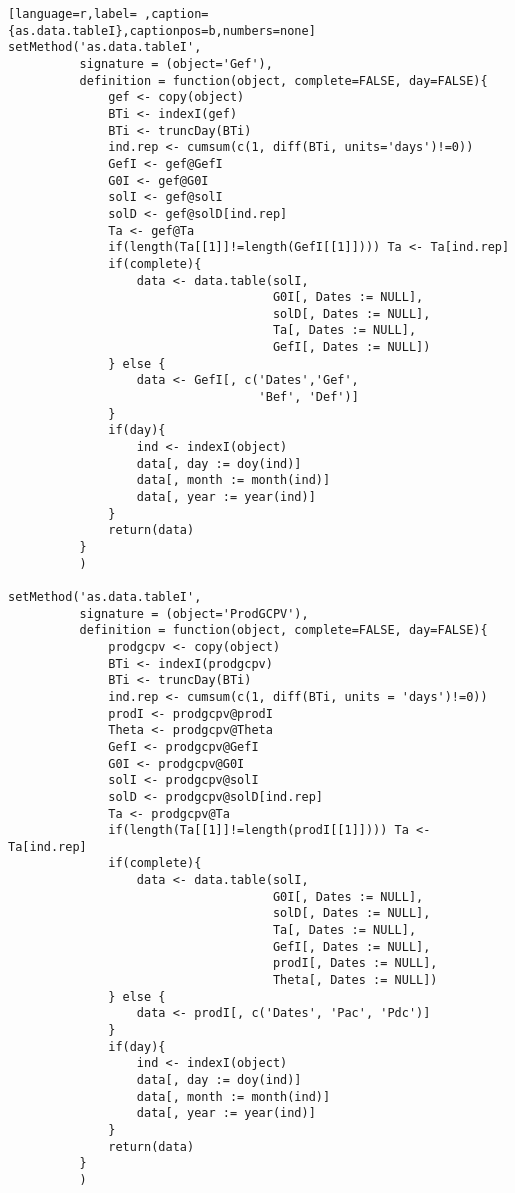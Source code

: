 \begin{lstlisting}[language=r,label= ,caption={as.data.tableI},captionpos=b,numbers=none]
setMethod('as.data.tableI',
          signature = (object='Gef'),
          definition = function(object, complete=FALSE, day=FALSE){
              gef <- copy(object)
              BTi <- indexI(gef)
              BTi <- truncDay(BTi)
              ind.rep <- cumsum(c(1, diff(BTi, units='days')!=0))
              GefI <- gef@GefI
              G0I <- gef@G0I
              solI <- gef@solI
              solD <- gef@solD[ind.rep]
              Ta <- gef@Ta
              if(length(Ta[[1]]!=length(GefI[[1]]))) Ta <- Ta[ind.rep]
              if(complete){
                  data <- data.table(solI,
                                     G0I[, Dates := NULL],
                                     solD[, Dates := NULL],
                                     Ta[, Dates := NULL],
                                     GefI[, Dates := NULL])
              } else {
                  data <- GefI[, c('Dates','Gef',
                                   'Bef', 'Def')]
              }
              if(day){
                  ind <- indexI(object)
                  data[, day := doy(ind)]
                  data[, month := month(ind)]
                  data[, year := year(ind)]
              }
              return(data)
          }
          )

setMethod('as.data.tableI',
          signature = (object='ProdGCPV'),
          definition = function(object, complete=FALSE, day=FALSE){
              prodgcpv <- copy(object)
              BTi <- indexI(prodgcpv)
              BTi <- truncDay(BTi)
              ind.rep <- cumsum(c(1, diff(BTi, units = 'days')!=0))
              prodI <- prodgcpv@prodI
              Theta <- prodgcpv@Theta
              GefI <- prodgcpv@GefI
              G0I <- prodgcpv@G0I
              solI <- prodgcpv@solI
              solD <- prodgcpv@solD[ind.rep]
              Ta <- prodgcpv@Ta
              if(length(Ta[[1]]!=length(prodI[[1]]))) Ta <- Ta[ind.rep]
              if(complete){
                  data <- data.table(solI,
                                     G0I[, Dates := NULL],
                                     solD[, Dates := NULL],
                                     Ta[, Dates := NULL],
                                     GefI[, Dates := NULL],
                                     prodI[, Dates := NULL],
                                     Theta[, Dates := NULL])
              } else {
                  data <- prodI[, c('Dates', 'Pac', 'Pdc')]
              }
              if(day){
                  ind <- indexI(object)
                  data[, day := doy(ind)]
                  data[, month := month(ind)]
                  data[, year := year(ind)]
              }
              return(data)
          }
          )


\end{lstlisting}
